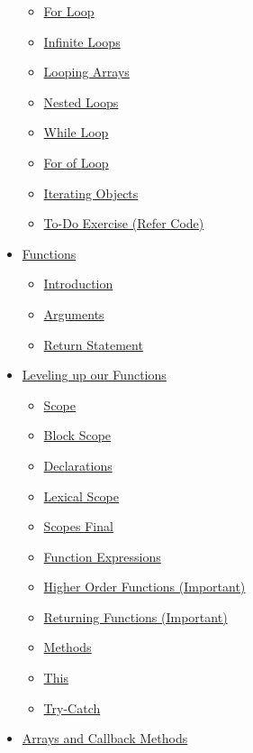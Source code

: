 \documentclass[
  paper=a4,
  ,captions=tableheading
]{scrartcl}
\providecommand{\tightlist}{%
  \setlength{\itemsep}{0pt}\setlength{\parskip}{0pt}}
\begin{document}
\begin{itemize}
  \begin{itemize}
  \tightlist
  \item
    \protect\hyperlink{for-loop}{For Loop}
  \item
    \protect\hyperlink{infinite-loops}{Infinite Loops}
  \item
    \protect\hyperlink{looping-arrays}{Looping Arrays}
  \item
    \protect\hyperlink{nested-loops}{Nested Loops}
  \item
    \protect\hyperlink{while-loop}{While Loop}
  \item
    \protect\hyperlink{for-of-loop}{For of Loop}
  \item
    \protect\hyperlink{iterating-objects}{Iterating Objects}
  \item
    \protect\hyperlink{to-do-exercise-refer-code}{To-Do Exercise (Refer
    Code)}
  \end{itemize}
\item
  \protect\hyperlink{functions}{Functions}

  \begin{itemize}
  \tightlist
  \item
    \protect\hyperlink{introduction-1}{Introduction}
  \item
    \protect\hyperlink{arguments}{Arguments}
  \item
    \protect\hyperlink{return-statement}{Return Statement}
  \end{itemize}
\item
  \protect\hyperlink{leveling-up-our-functions}{Leveling up our
  Functions}

  \begin{itemize}
  \tightlist
  \item
    \protect\hyperlink{scope}{Scope}
  \item
    \protect\hyperlink{block-scope}{Block Scope}
  \item
    \protect\hyperlink{declarations}{Declarations}
  \item
    \protect\hyperlink{lexical-scope}{Lexical Scope}
  \item
    \protect\hyperlink{scopes-final}{Scopes Final}
  \item
    \protect\hyperlink{function-expressions}{Function Expressions}
  \item
    \protect\hyperlink{higher-order-functions-important}{Higher Order
    Functions (Important)}
  \item
    \protect\hyperlink{returning-functions-important}{Returning
    Functions (Important)}
  \item
    \protect\hyperlink{methods}{Methods}
  \item
    \protect\hyperlink{this}{This}
  \item
    \protect\hyperlink{try-catch}{Try-Catch}
  \end{itemize}
\item
  \protect\hyperlink{arrays-and-callback-methods}{Arrays and Callback
  Methods}


\end{itemize}
\end{document}
